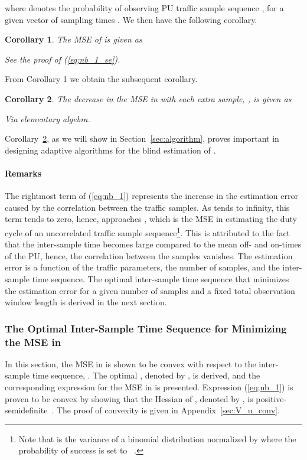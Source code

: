 \documentclass[11pt,draftclsnofoot,journal,onecolumn]{IEEEtran}
\newtheorem{corollary}{Corollary}
\begin{document}
where  denotes the probability of observing PU traffic sample sequence , for a given vector of sampling times . We then have the following corollary.
\begin{corollary}
The MSE of  is given as

\begin{IEEEproof}
See the proof of (\ref{eq;nb_1_se}).
\end{IEEEproof} 
\end{corollary}
From Corollary 1 we obtain the subsequent corollary.
\begin{corollary}
\label{cor_3}
The decrease in the MSE in  with each extra sample, , is given as

\begin{IEEEproof}
Via elementary algebra.
\end{IEEEproof} 
\end{corollary}
Corollary~\ref{cor_3}, as we will show in Section~\ref{sec:algorithm}, proves important in designing adaptive algorithms for the blind estimation of .

\paragraph*{Remarks}

The rightmost term of (\ref{eq;nb_1}) represents the increase in the estimation error caused by the correlation between the traffic samples. As  tends to infinity, this term tends to zero, hence,  approaches , which is the MSE in estimating the duty cycle of an uncorrelated traffic sample sequence\footnote{Note that  is the variance of a binomial distribution normalized by  where the probability of success is set to ~\cite[Ch. 4]{prob_schaum}.}. This is attributed to the fact that the inter-sample time becomes large compared to the mean off- and on-times of the PU, hence, the correlation between the samples vanishes. The estimation error is a function of the traffic parameters, the number of samples, and the inter-sample time sequence. The optimal inter-sample time sequence that minimizes the estimation error for a given number of samples and a fixed total observation window length is derived in the next section.

\subsubsection{The Optimal Inter-Sample Time Sequence for Minimizing the MSE in }
\label{sec:optim_u}

In this section, the MSE in  is shown to be convex with respect to the inter-sample time sequence, . The optimal , denoted by , is derived, and the corresponding expression for the MSE in  is presented. Expression (\ref{eq;nb_1}) is proven to be convex by showing that the Hessian of , denoted by , is positive-semidefinite~\cite{berghe}. The proof of convexity is given in Appendix~\ref{sec:V_u_conv}. 
\end{document}
